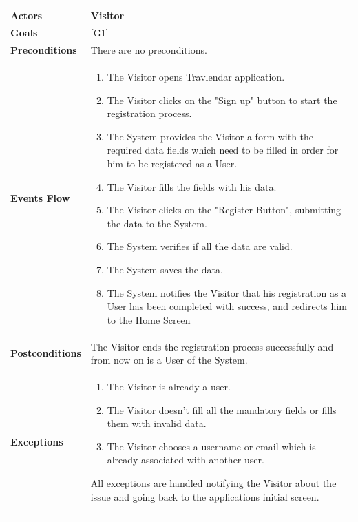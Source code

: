 \documentclass[12pt]{article}
\begin{document}
\begin{center}
    \begin{tabular} { |p{}|p{}| }
        \hline
        \textbf{Actors} & Visitor \\ 
        \hline
        \textbf{Goals} & {[G1]} \\ 
        \hline  
        \textbf{Preconditions} & There are no preconditions. \\ 
        \hline
        \textbf{Events Flow} & \begin{enumerate}[topsep=0pt]
                            \setlength{\itemsep}{0.5pt}
                            \item The Visitor opens Travlendar application.
                            \item The Visitor clicks on the "Sign up" button to start the registration process.
                            \item The System provides the Visitor a form with the required data fields which need to be filled in order for him to be registered as a User.
                            \item The Visitor fills the fields with his data. 
                            \item The Visitor clicks on the "Register Button", submitting the data to the System.
                            \item The System verifies if all the data are valid.
                            \item The System saves the data.
                            \item The System notifies the Visitor that his registration as a User has been completed with success, and redirects him to the Home Screen
                            \end{enumerate} \\
        \hline
        \textbf{Postconditions} & The Visitor ends the registration process successfully and from now on is a User of the System. \\
        \hline
        \textbf{Exceptions} & \begin{enumerate}[topsep=0pt]
                            \setlength{\itemsep}{0.5pt}
                            \item The Visitor is already a user. 
                            \item The Visitor doesn't fill all the mandatory fields or fills them with invalid data.
                            \item The Visitor chooses a username or email which is already associated with another user.
                            \end{enumerate} 
                            All exceptions are handled notifying the Visitor about the issue and going back to the applications initial screen.\\ 
        \hline
    \end{tabular}
\end{center}
\end{document}
